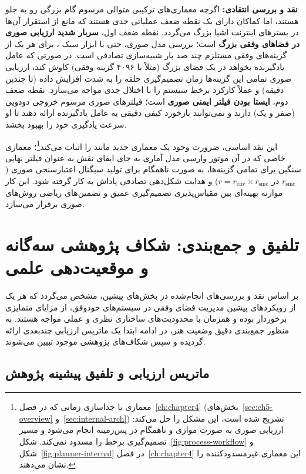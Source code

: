 \documentclass[oneside,openany,phd]{TMU-Thesis}
\begin{document}
\textbf{نقد و بررسی انتقادی:}
اگرچه معماری‌های ترکیبی متوالی مرسوم گام بزرگی رو به جلو هستند، اما کماکان دارای یک نقطه ضعف عملیاتی جدی هستند که مانع از استقرار آن‌ها در بسترهای اینترنت اشیا بزرگ می‌گردد.
نقطه ضعف اول، \textbf{سربار شدید ارزیابی صوری در فضاهای وفقی بزرگ} است؛ بررسی مدل صوری، حتی با ابزار سبک ، برای هر یک از گزینه‌های وفقی مستلزم چند صد بار شبیه‌سازی تصادفی است. در صورتی که عامل یادگیرنده بخواهد در یک فضای بزرگ (مثلاً با ۴۰۹۶ گزینه وفقی) کاوش کند، ارزیابی صوری تمامی این گزینه‌ها زمان تصمیم‌گیری حلقه  را به شدت افزایش داده (تا چندین دقیقه) و عملاً کارکرد برخط سیستم را با اختلال جدی مواجه می‌سازد.
نقطه ضعف دوم، \textbf{ایستا بودن فیلتر ایمنی صوری} است؛ فیلترهای صوری مرسوم خروجی دودویی (صفر و یک) دارند و نمی‌توانند بازخورد کیفی دقیقی به عامل یادگیرنده ارائه دهند تا او سرعت یادگیری خود را بهبود بخشد.

این نقد اساسی، ضرورت وجود یک معماری جدید مانند  را اثبات می‌کند\footnote{معماری  با جداسازی زمانی که در فصل~\ref{ch:chapter4} (بخش‌های~\ref{sec:ch5-overview} و~\ref{sec:internal-arch}) تشریح شده است، این مشکل را حل می‌کند: ارزیابی صوری به صورت موازی و ناهمگام در پس‌زمینه انجام می‌شود و مسیر تصمیم‌گیری برخط را مسدود نمی‌کند. شکل~\ref{fig:process-workflow} و شکل~\ref{fig:planner-internal} در فصل~\ref{ch:chapter4} این معماری غیرمسدودکننده را نشان می‌دهند.}؛ معماری خاصی که در آن موتور وارسی مدل آماری  به جای ایفای نقش به عنوان فیلتر نهایی سنگین برای تمامی گزینه‌ها، به صورت ناهمگام برای تولید سیگنال اعتبارسنجی صوری ($r_{\text{smc}}$ در $r = r_{\text{env}} \times r_{\text{smc}}$) و هدایت شکل‌دهی تصادفی پاداش به کار گرفته شود. این کار موازنه بهینه‌ای بین مقیاس‌پذیری تصمیم‌گیری عمیق و تضمین‌های ریاضی روش‌های صوری برقرار می‌سازد.

\section{تلفیق و جمع‌بندی: شکاف پژوهشی سه‌گانه و موقعیت‌دهی علمی }
\label{sec:ch3_synthesis}

بر اساس نقد و بررسی‌های انجام‌شده در بخش‌های پیشین، مشخص می‌گردد که هر یک از رویکردهای پیشین مدیریت فضای وفقی در سیستم‌های خودوفق، از مزایای متمایزی برخوردار بوده و همزمان با محدودیت‌های ساختاری نظری و عملی مواجه هستند. به منظور جمع‌بندی دقیق وضعیت هنر، در ادامه ابتدا یک ماتریس ارزیابی چندبعدی ارائه گردیده و سپس شکاف‌های پژوهشی موجود تبیین می‌شوند.

\subsection{ماتریس ارزیابی و تلفیق پیشینه پژوهش}
\label{sec:ch3_synthesis_matrix}
\end{document}
